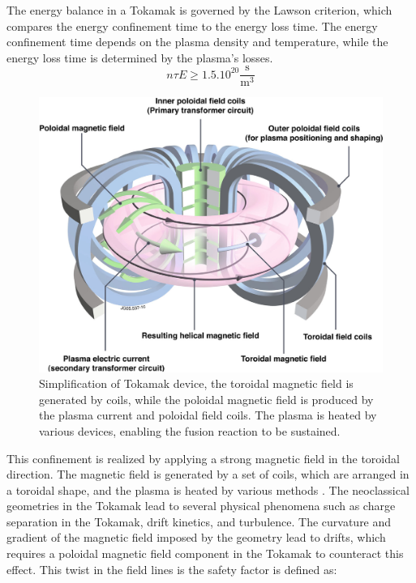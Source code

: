 \documentclass[11pt,openany]{report}
\begin{document}
\begin{multicols}{2}
    The energy balance in a Tokamak is governed by the Lawson criterion, which compares the energy confinement time to the energy loss time. The energy confinement time depends on the plasma density and temperature, while the energy loss time is determined by the plasma's losses.
    $$n \tau E \ge 1.5.10^{20}{\frac {\mathrm {s} }{\mathrm {m} ^{3}}}$$
    \begin{figure}[H]
        \centering
        \includegraphics[width=1\linewidth]{./figures/tokamak.png}
        \caption{Simplification of Tokamak device, the toroidal magnetic field is generated by coils, while the poloidal magnetic field is produced by the plasma current and poloidal field coils. The plasma is heated by various devices, enabling the fusion reaction to be sustained.}
        \label{}
    \end{figure}
    This confinement is realized by applying a strong magnetic field in the toroidal direction. The magnetic field is generated by a set of coils, which are arranged in a toroidal shape, and the plasma is heated by various methods \cite{Heating}. The neoclassical geometries in the Tokamak lead to several physical phenomena such as charge separation in the Tokamak, drift kinetics, and turbulence. The curvature and gradient of the magnetic field \cite{piel2018plasma} imposed by the geometry lead to drifts, which requires a poloidal magnetic field component in the Tokamak to counteract this effect. This twist in the field lines is the safety factor is defined as:



\end{multicols}
\end{document}
